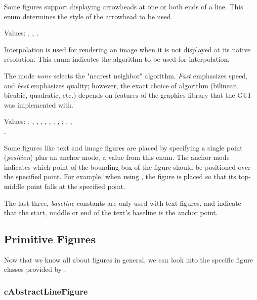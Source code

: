 Some figures support displaying arrowheads at one or both ends of a line.
This enum determines the style of the arrowhead to be used.

\begin{center}
\end{center}


Values: , , .

Interpolation is used for rendering an image when it is not displayed at
its native resolution. This enum indicates the algorithm to be used for
interpolation.

The mode \textit{none} selects the "nearest neighbor" algorithm.
\textit{Fast} emphasizes speed, and \textit{best} emphasizes quality;
however, the exact choice of algorithm (bilinear, bicubic, quadratic, etc.)
depends on features of the graphics library that the GUI was implemented with.


Values:
, , , , ,
, , , ;
, , \\ .

Some figures like text and image figures are placed by specifying a single
point (\textit{position}) plus an anchor mode, a value from this enum. The
anchor mode indicates which point of the bounding box of the figure should
be positioned over the specified point. For example, when using
, the figure is placed so that its top-middle point falls at
the specified point.

The last three, \textit{baseline} constants are only used with text
figures, and indicate that the start, middle or end of the text's baseline
is the anchor point.


\subsection{Primitive Figures}
\label{sec:graphics:primitive-figures}

Now that we know all about figures in general, we can look into the
specific figure classes provided by {\opp}.

\subsubsection{cAbstractLineFigure}
\label{sec:graphics:abstractlinefigure}

